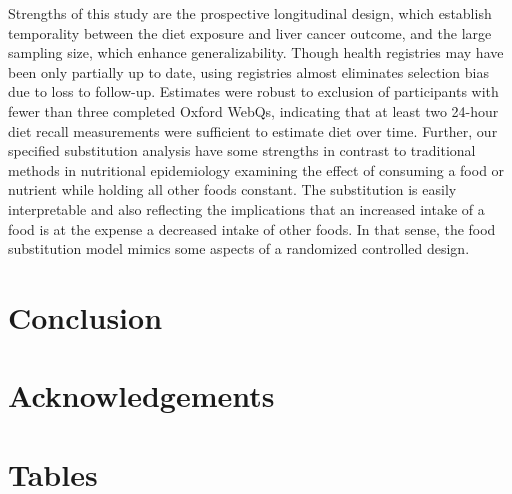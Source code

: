 \documentclass[sn-basic,Numbered,pdflatex]{sn-jnl}
\begin{document}
Strengths of this study are the prospective longitudinal design, which
establish temporality between the diet exposure and liver cancer
outcome, and the large sampling size, which enhance generalizability.
Though health registries may have been only partially up to date, using
registries almost eliminates selection bias due to loss to follow-up.
Estimates were robust to exclusion of participants with fewer than three
completed Oxford WebQs, indicating that at least two 24-hour diet recall
measurements were sufficient to estimate diet over time. Further, our
specified substitution analysis have some strengths in contrast to
traditional methods in nutritional epidemiology examining the effect of
consuming a food or nutrient while holding all other foods constant. The
substitution is easily interpretable and also reflecting the
implications that an increased intake of a food is at the expense a
decreased intake of other foods. In that sense, the food substitution
model mimics some aspects of a randomized controlled design.

\hypertarget{sec5}{%
\section{Conclusion}\label{sec5}}

\hypertarget{sec6}{%
\section{Acknowledgements}\label{sec6}}

\newpage

\hypertarget{sec7}{%
\section{Tables}\label{sec7}}
\end{document}
